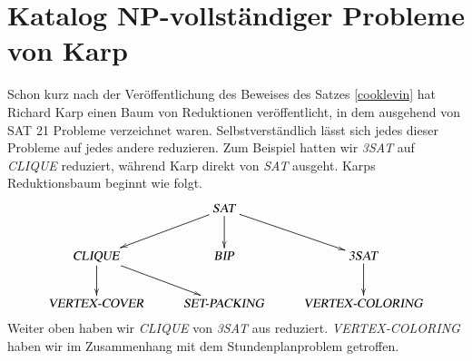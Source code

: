 %
%
%
%

\section{Katalog NP-vollständiger Probleme von Karp}
Schon kurz nach der Veröffentlichung des Beweises des Satzes
\ref{cooklevin} hat Richard Karp einen Baum von Reduktionen
veröffentlicht, in dem ausgehend von SAT 21 Probleme verzeichnet
waren.
Selbstverständlich lässt
sich jedes dieser Probleme auf jedes andere reduzieren. Zum Beispiel
hatten wir \textsl{3SAT} auf \textsl{CLIQUE} reduziert, während
Karp direkt von \textsl{SAT} ausgeht. Karps Reduktionsbaum
beginnt wie folgt.
\[
\xymatrix{
{}
	&\text{\textsl{SAT}} \ar[dl] \ar[d] \ar[dr]
\\
\text{\textsl{CLIQUE}} \ar[d] \ar[dr]
	&\text{\textsl{BIP}}
		&\text{\textsl{3SAT}} \ar[d]
\\
\text{\textsl{VERTEX-COVER}}
	&\text{\textsl{SET-PACKING}}
		&\text{\textsl{VERTEX-COLORING}}
}
\]
Weiter oben haben wir \textsl{CLIQUE} von \textsl{3SAT} aus
reduziert. \textsl{VERTEX-COLORING} haben wir im Zusammenhang
mit dem Stundenplanproblem getroffen.

